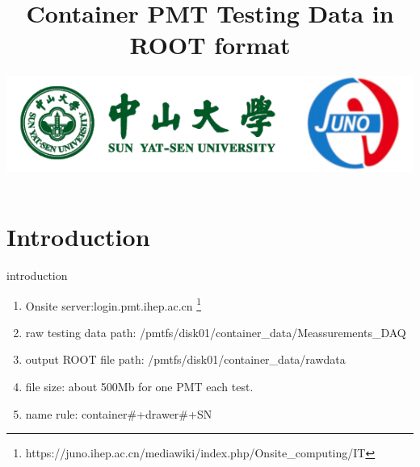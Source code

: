 \documentclass[11pt,compress,xcolor=x11names,UTF8]{beamer}
\title{Container PMT Testing Data in ROOT format}
\author[Rong. Zhao]{Email：zhaor25@mail2.sysu.edu.cn \and  } %
\institute[Sun Yat-Sen University]{School of Physics\and } %
\date[\today]{\includegraphics[width=.5\textwidth]{logo}}
\begin{document}
\maketitle


\section{Introduction}


%
\begin{frame}{ introduction }
	\begin{enumerate}
		\item Onsite server:login.pmt.ihep.ac.cn  \footnote{https://juno.ihep.ac.cn/mediawiki/index.php/Onsite\_computing/IT}
		\item raw testing data path: /pmtfs/disk01/container\_data/Meassurements\_DAQ
		\item output ROOT file path: /pmtfs/disk01/container\_data/rawdata 
		\item file size: about 500Mb for one PMT each test.
		\item name rule: container#+drawer#+SN
	\end{enumerate}
\end{frame}
\end{document}
